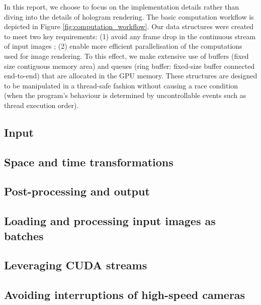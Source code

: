 

In this report, we choose to focus on the implementation details rather than diving into the details of hologram rendering. The basic computation workflow is depicted in Figure \ref{fig:computation_workflow}. Our data structures were created to meet two key requirements: (1) avoid any frame drop in the continuous stream of input images ; (2) enable more efficient parallelisation of the computations used for image rendering. To this effect, we make extensive use of buffers (fixed size contiguous memory area) and queues (ring buffer: fixed-size buffer connected end-to-end) that are allocated in the GPU memory. These structures are designed to be manipulated in a thread-safe fashion without causing a race condition (when the program's behaviour is determined by uncontrollable events such as thread execution order).

\subsection{Input}


\subsection{Space and time transformations}


\subsection{Post-processing and output}


\subsection{Loading and processing input images as batches}


\subsection{Leveraging CUDA streams}


\subsection{Avoiding interruptions of high-speed cameras}


